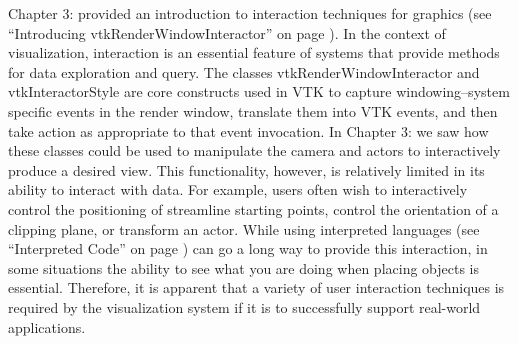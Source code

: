 Chapter 3:  provided an introduction to interaction techniques for graphics (see ``Introducing vtkRenderWindowInteractor'' on page \pageref{subsec:examples_introducing_vtkRenderWindowInteractor} ).
In the context of visualization, interaction is an essential feature of systems that provide methods for data exploration and query. The classes
vtkRenderWindowInteractor and vtkInteractorStyle are core constructs used in VTK to capture windowing--system specific events in the render window, translate them into VTK events, and then take action as appropriate to that event invocation.
In Chapter 3:  we saw how these classes could be used to manipulate the camera and actors to interactively produce a desired view. This functionality, however, is relatively limited in its ability to interact with data. For example, users often wish to interactively control the positioning of streamline starting points, control the orientation of a clipping plane, or transform an actor. While using interpreted languages (see ``Interpreted Code'' on page \pageref{subsec:examples_interpreted_code} ) can go a long way to provide this interaction, in some situations the ability to see what you are doing when placing objects is essential. Therefore, it is apparent that a variety of user interaction techniques is required by the visualization system if it is to successfully support real-world applications.

